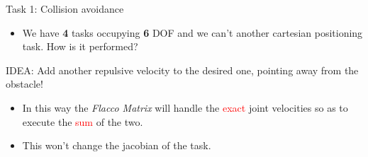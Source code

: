 \documentclass[11pt]{beamer}
\begin{document}
\begin{frame}{Task 1: Collision avoidance}
\begin{itemize}
\item We have \textbf{4} tasks occupying \textbf{6} DOF and we can't another cartesian positioning task. How is it performed?
\end{itemize}
\begin{block}{IDEA:}
Add another repulsive velocity to the desired one, pointing away from the obstacle! 
\end{block}
\begin{itemize}
\item In this way the \emph{Flacco Matrix} will handle the \textcolor{red}{exact} joint velocities so as to execute the \textcolor{red}{sum} of the two.
\item This won't change the jacobian of the task.
\end{itemize}
\end{frame}
\end{document}
